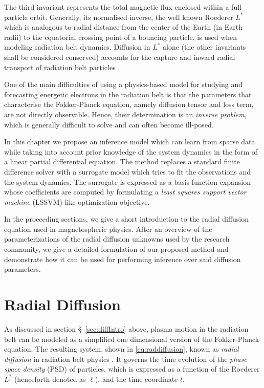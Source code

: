 The third invariant represents the total magnetic flux enclosed within a full particle orbit. 
Generally, its normalised inverse, the well known Roederer $L^{*}$ \citep{Roederer1970} which is 
analogous to radial distance from the center of the Earth (in Earth radii) to the equatorial 
crossing point of a bouncing particle, is used when modeling radiation belt dynamics. Diffusion in 
$L^{*}$ alone (the other invariants shall be considered conserved) accounts for the capture and 
inward radial transport of radiation belt particles \citep{Roederer1970,JGR:JGR4463}.

One of the main difficulties of using a physics-based model for studying and forecasting energetic 
electrons in the radiation belt is that the parameters that characterise the Fokker-Planck 
equation, namely diffusion tensor and loss term, are not directly observable. Hence, their 
determination is an \emph{inverse problem}, which is generally difficult to solve and can often 
become ill-posed.

In this chapter we propose an inference model which can learn from sparse data while taking into 
account prior knowledge of the system dynamics in the form of a linear partial differential 
equation. The method replaces a standard finite difference solver with a surrogate model which 
tries to fit the observations and the system dynamics. The surrogate is expressed as a basis 
function expansion whose coefficients are computed by formulating a 
\emph{least squares support vector machine} (LSSVM) like optimization objective.

In the proceeding sections, we give a short introduction to the radial diffusion equation used in 
magnetospheric physics. After an overview of the parameterizations of the radial diffusion unknowns 
used by the research community, we give a detailed formulation of our proposed method and 
demonstrate how it can be used for performing inference over said diffusion parameters.

\section{Radial Diffusion}

As discussed in section \S~\ref{sec:diffIntro} above, plasma motion in the radiation belt can be 
modeled as a simplified one dimensional version of the Fokker-Planck equation. The resulting 
system, shown in \cref{eq:raddiffusion}, known as \emph{radial diffusion} in radiation belt 
physics \citep{JGRA:JGRA9345}. It governs the time evolution of the \emph{phase space density} 
(PSD) of particles, which is expressed as a function of the Roederer $L^{*}$ 
(henceforth denoted as $\ell$), and the time coordinate $t$.

